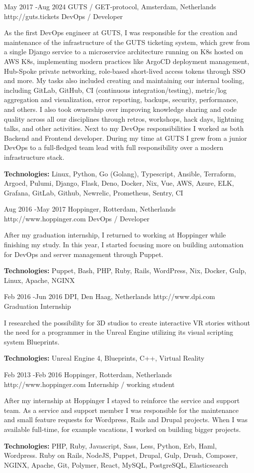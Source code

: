\documentclass[10pt]{article} %
\begin{document}
\job
{May 2017 -}{Aug 2024}
{GUTS / GET-protocol, Amsterdam, Netherlands}
{http://guts.tickets}
{DevOps / Developer}
{As the first DevOps engineer at GUTS, I was responsible for the creation and maintenance of the infrastructure of the GUTS ticketing system, which grew from a single Django service to a microservice architecture running on K8s hosted on AWS K8s, implementing modern practices like ArgoCD deployment management, Hub-Spoke private networking, role-based short-lived access tokens through SSO and more. My tasks also included creating and maintaining our internal tooling, including GitLab, GitHub, CI (continuous integration/testing), metric/log aggregation and visualization, error reporting, backups, security, performance, and others. I also took ownership over improving knowledge sharing and code quality across all our disciplines through retros, workshops, hack days, lightning talks, and other activities. Next to my DevOps responsibilities I worked as both Backend and Frontend developer. During my time at GUTS I grew from a junior DevOps to a full-fledged team lead with full responsibility over a modern infrastructure stack.

\rule{0mm}{5mm}\textbf{Technologies:} Linux, Python, Go (Golang), Typescript, Ansible, Terraform, Argocd, Pulumi, Django, Flask, Deno, Docker, Nix, Vue, AWS, Azure, ELK, Grafana, GitLab, Github, Newrelic, Prometheus, Sentry, CI}

\job
{Aug 2016 -}{May 2017}
{Hoppinger, Rotterdam, Netherlands}
{http://www.hoppinger.com}
{DevOps / Developer}
{After my graduation internship, I returned to working at Hoppinger while finishing my study. In this year, I started focusing more on building automation for DevOps and server management through Puppet.

\rule{0mm}{5mm}\textbf{Technologies:} Puppet, Bash, PHP, Ruby, Rails, WordPress, Nix, Docker, Gulp, Linux, Apache, NGINX }

\job
{Feb 2016 -}{Jun 2016}
{DPI, Den Haag, Netherlands}
{http://www.dpi.com}
{Graduation Internship}
{I researched the possibility for 3D studios to create interactive VR stories without the need for a programmer in the Unreal Engine utilizing its visual scripting system Blueprints.\\

\rule{0mm}{5mm}\textbf{Technologies:} Unreal Engine 4, Blueprints, C++, Virtual Reality}

\job
{Feb 2013 -}{Feb 2016}
{Hoppinger, Rotterdam, Netherlands}
{http://www.hoppinger.com}
{Internship / working student}
{After my internship at Hoppinger I stayed to reinforce the service and support team. As a service and support member I was responsible for the maintenance and small feature requests for Wordpress, Rails and Drupal projects. When I was available full-time, for example vacations, I worked on building bigger projects.

\rule{0mm}{5mm}\textbf{Technologies:} PHP, Ruby, Javascript, Sass, Less, Python, Erb, Haml, Wordpress. Ruby on Rails, NodeJS, Puppet, Drupal, Gulp, Drush, Composer, NGINX, Apache, Git, Polymer, React, MySQL, PostgreSQL, Elasticsearch
}
\end{document}
